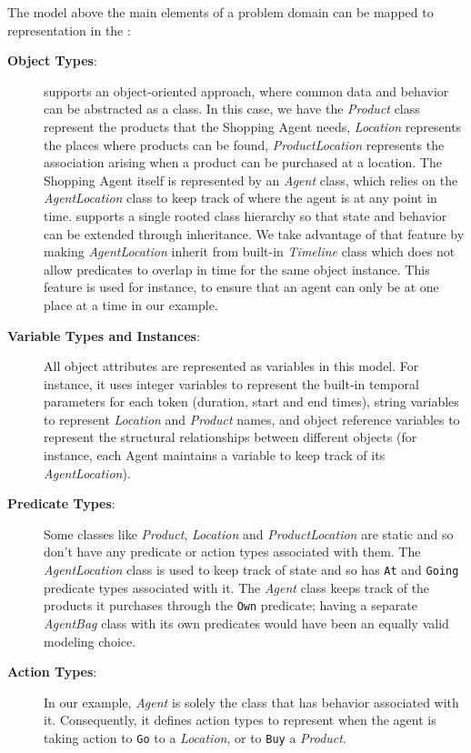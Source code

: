 The model above the main elements of a problem domain can be mapped to
\eus representation in the :

\begin{description}

\item[\textbf{Object Types}:] \nd supports an object-oriented
  approach, where common data and behavior can be abstracted as a
  class. In this case, we have the \textit{Product} class represent
  the products that the Shopping Agent needs, \textit{Location}
  represents the places where products can be found,
  \textit{ProductLocation} represents the association arising when a
  product can be purchased at a location. The Shopping Agent itself is
  represented by an \textit{Agent} class, which relies on the
  \textit{AgentLocation} class to keep track of where the agent is at
  any point in time. \nd supports a single rooted class hierarchy so
  that state and behavior can be extended through inheritance. We take
  advantage of that feature by making \textit{AgentLocation} inherit
  from \eus built-in \textit{Timeline} class which does not allow
  predicates to overlap in time for the same object instance. This
  feature is used for instance, to ensure that an agent can only be at
  one place at a time in our example.

\item[\textbf{Variable Types and Instances}:] All object attributes
  are represented as variables in this model. For instance, it uses
  integer variables to represent the built-in temporal parameters for
  each token (duration, start and end times), string
  variables to represent \textit{Location} and \textit{Product} names,
  and object reference variables to represent the structural
  relationships between different objects (for instance, each Agent
  maintains a variable to keep track of its \textit{AgentLocation}).

\item[\textbf{Predicate Types}:] Some classes like \textit{Product},
  \textit{Location} and \textit{ProductLocation} are static and so
  don't have any predicate or action types associated with them. The
  \textit{AgentLocation} class is used to keep track of state and so
  has \texttt{At} and \texttt{Going} predicate types associated with
  it. The \textit{Agent} class keeps track of the products it
  purchases through the \texttt{Own} predicate; having a separate
  \textit{AgentBag} class with its own predicates would have been an
  equally valid modeling choice.

\item[\textbf{Action Types}:] In our example, \textit{Agent} is solely
  the class that has behavior associated with it. Consequently, it
  defines action types to represent when the agent is taking action to
  \texttt{Go} to a \textit{Location}, or to \texttt{Buy} a
  \textit{Product}. 
  
\end{description}

